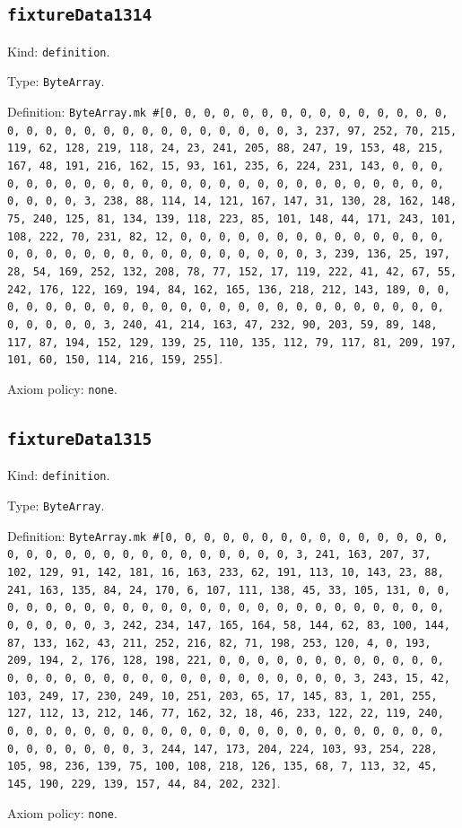 \documentclass[11pt]{article}
\begin{document}
\subsection*{\texttt{fixtureData1314}}
\noindent Kind: \texttt{definition}.\par
\noindent Type: \texttt{ByteArray}.\par
\noindent Definition: \texttt{ByteArray.mk \#[0, 0, 0, 0, 0, 0, 0, 0, 0, 0, 0, 0, 0, 0, 0, 0, 0, 0, 0, 0, 0, 0, 0, 0, 0, 0, 0, 0, 0, 0, 3, 237, 97, 252, 70, 215, 119, 62, 128, 219, 118, 24, 23, 241, 205, 88, 247, 19, 153, 48, 215, 167, 48, 191, 216, 162, 15, 93, 161, 235, 6, 224, 231, 143, 0, 0, 0, 0, 0, 0, 0, 0, 0, 0, 0, 0, 0, 0, 0, 0, 0, 0, 0, 0, 0, 0, 0, 0, 0, 0, 0, 0, 0, 0, 3, 238, 88, 114, 14, 121, 167, 147, 31, 130, 28, 162, 148, 75, 240, 125, 81, 134, 139, 118, 223, 85, 101, 148, 44, 171, 243, 101, 108, 222, 70, 231, 82, 12, 0, 0, 0, 0, 0, 0, 0, 0, 0, 0, 0, 0, 0, 0, 0, 0, 0, 0, 0, 0, 0, 0, 0, 0, 0, 0, 0, 0, 0, 0, 3, 239, 136, 25, 197, 28, 54, 169, 252, 132, 208, 78, 77, 152, 17, 119, 222, 41, 42, 67, 55, 242, 176, 122, 169, 194, 84, 162, 165, 136, 218, 212, 143, 189, 0, 0, 0, 0, 0, 0, 0, 0, 0, 0, 0, 0, 0, 0, 0, 0, 0, 0, 0, 0, 0, 0, 0, 0, 0, 0, 0, 0, 0, 0, 3, 240, 41, 214, 163, 47, 232, 90, 203, 59, 89, 148, 117, 87, 194, 152, 129, 139, 25, 110, 135, 112, 79, 117, 81, 209, 197, 101, 60, 150, 114, 216, 159, 255]}.\par
\noindent Axiom policy: \texttt{none}.\par
\subsection*{\texttt{fixtureData1315}}
\noindent Kind: \texttt{definition}.\par
\noindent Type: \texttt{ByteArray}.\par
\noindent Definition: \texttt{ByteArray.mk \#[0, 0, 0, 0, 0, 0, 0, 0, 0, 0, 0, 0, 0, 0, 0, 0, 0, 0, 0, 0, 0, 0, 0, 0, 0, 0, 0, 0, 0, 0, 3, 241, 163, 207, 37, 102, 129, 91, 142, 181, 16, 163, 233, 62, 191, 113, 10, 143, 23, 88, 241, 163, 135, 84, 24, 170, 6, 107, 111, 138, 45, 33, 105, 131, 0, 0, 0, 0, 0, 0, 0, 0, 0, 0, 0, 0, 0, 0, 0, 0, 0, 0, 0, 0, 0, 0, 0, 0, 0, 0, 0, 0, 0, 0, 3, 242, 234, 147, 165, 164, 58, 144, 62, 83, 100, 144, 87, 133, 162, 43, 211, 252, 216, 82, 71, 198, 253, 120, 4, 0, 193, 209, 194, 2, 176, 128, 198, 221, 0, 0, 0, 0, 0, 0, 0, 0, 0, 0, 0, 0, 0, 0, 0, 0, 0, 0, 0, 0, 0, 0, 0, 0, 0, 0, 0, 0, 0, 0, 3, 243, 15, 42, 103, 249, 17, 230, 249, 10, 251, 203, 65, 17, 145, 83, 1, 201, 255, 127, 112, 13, 212, 146, 77, 162, 32, 18, 46, 233, 122, 22, 119, 240, 0, 0, 0, 0, 0, 0, 0, 0, 0, 0, 0, 0, 0, 0, 0, 0, 0, 0, 0, 0, 0, 0, 0, 0, 0, 0, 0, 0, 0, 0, 3, 244, 147, 173, 204, 224, 103, 93, 254, 228, 105, 98, 236, 139, 75, 100, 108, 218, 126, 135, 68, 7, 113, 32, 45, 145, 190, 229, 139, 157, 44, 84, 202, 232]}.\par
\noindent Axiom policy: \texttt{none}.\par
\end{document}
